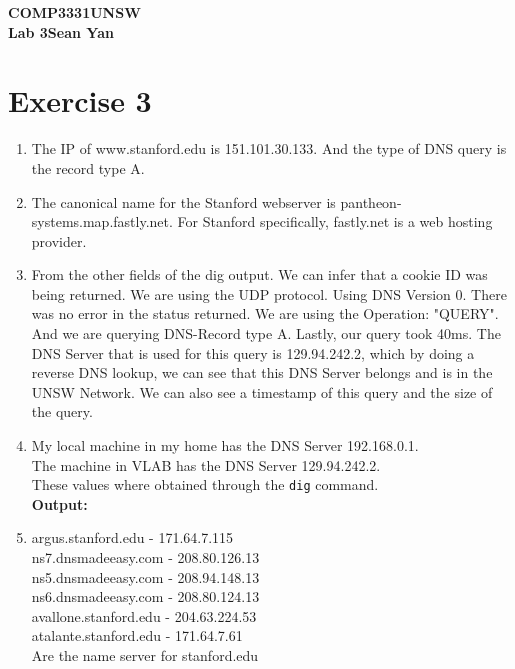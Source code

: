 \documentclass[12pt]{article}
\begin{document}
\noindent
\textbf{COMP3331\hfill UNSW\\Lab 3\hfill Sean Yan}

\section*{Exercise 3}
\begin{enumerate}

    \item The IP of www.stanford.edu is 151.101.30.133. And the type of DNS query is 
        the record type A. 

    \item The canonical name for the Stanford webserver is 
        pantheon-systems.map.fastly.net. For Stanford 
        specifically, fastly.net is a web hosting provider.

    \item From the other fields of the dig output. We can infer that 
        a cookie ID was being returned. We are using the UDP protocol. 
        Using DNS Version 0. There was no error in the status returned. We 
        are using the Operation: "QUERY". And we are querying DNS-Record type
        A. Lastly, our query took 40ms. The DNS Server that is used for 
        this query is 129.94.242.2, which by doing a reverse DNS lookup,
        we can see that this DNS Server belongs and is in the 
        UNSW Network. We can also see a timestamp of this query and the size
        of the query.

    \item My local machine in my home has the DNS Server 192.168.0.1. \\
        The machine in VLAB has the DNS Server 129.94.242.2. \\ 
        These values where obtained through the \lstinline{dig} command.\\
        \textbf{Output: }
        

    \item argus.stanford.edu - 171.64.7.115 \\
        ns7.dnsmadeeasy.com - 208.80.126.13 \\
        ns5.dnsmadeeasy.com - 208.94.148.13 \\
    	ns6.dnsmadeeasy.com - 208.80.124.13 \\
        avallone.stanford.edu - 204.63.224.53 \\
        atalante.stanford.edu - 171.64.7.61 \\ 
        Are the name server for stanford.edu 


\end{enumerate}
\end{document}
